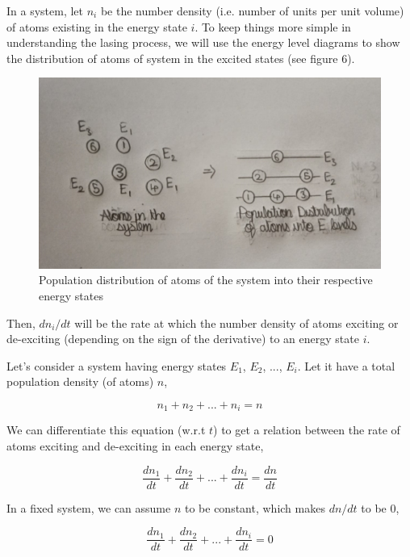 \documentclass[12pt]{article}
\begin{document}
In a system, let $n_{i}$ be the number density (i.e. number of units per unit volume) of atoms existing in the energy state $i$. To keep things more simple in understanding the lasing process, we will use the energy level diagrams to show the distribution of atoms of system in the excited states (see figure 6).

\begin{figure}[H]
    \centering
    \includegraphics[scale=.5]{./img/06_population_dist.png}
    \caption{Population distribution of atoms of the system into their respective energy states}
\end{figure}

Then, $dn_{i}/dt$ will be the rate at which the number density of atoms exciting or de-exciting (depending on the sign of the derivative) to an energy state $i$. 

Let's consider a system having energy states $E_{1}$, $E_{2}$, ..., $E_{i}$. Let it have a total population density (of atoms) $n$,

\begin{equation}
    n_{1} + n_{2} + ... + n_{i} = n
\end{equation}

We can differentiate this equation (w.r.t $t$) to get a relation between the rate of atoms exciting and de-exciting in each energy state,

\begin{equation*}
    \frac{dn_{1}}{dt} + \frac{dn_{2}}{dt} + ... + \frac{dn_{i}}{dt} = \frac{dn}{dt}
\end{equation*}

In a fixed system, we can assume $n$ to be constant, which makes $dn/dt$ to be 0,

\begin{equation*}
    \frac{dn_{1}}{dt} + \frac{dn_{2}}{dt} + ... + \frac{dn_{i}}{dt} = 0
\end{equation*}
\end{document}
